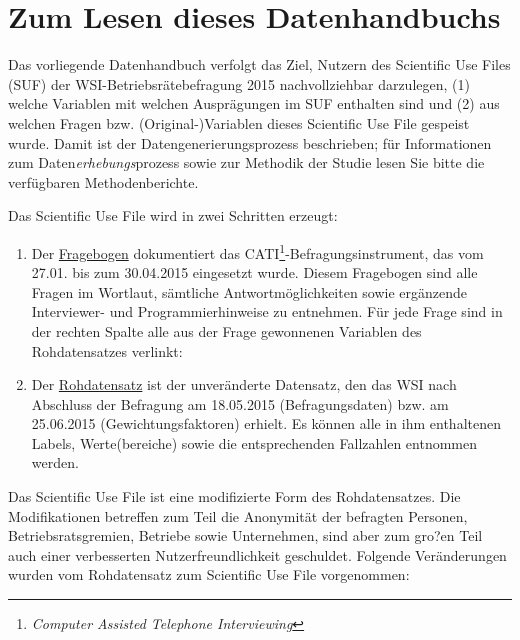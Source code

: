 \section{Zum Lesen dieses Datenhandbuchs}

Das vorliegende Datenhandbuch verfolgt das Ziel, Nutzern des Scientific Use Files (SUF) der WSI-Be\-triebs\-rä\-te\-be\-fra\-gung 2015 nachvollziehbar darzulegen, (1) welche Variablen mit welchen Ausprägungen im SUF enthalten sind und (2) aus welchen Fragen bzw. (Original-)Variablen dieses Scientific Use File gespeist wurde. Damit ist der Datengenerierungsprozess beschrieben; für Informationen zum Daten\textit{erhebungs}prozess sowie zur Methodik der Studie lesen Sie bitte die verfügbaren Methodenberichte.

Das Scientific Use File wird in zwei Schritten erzeugt:

\begin{enumerate}

\item Der \hyperref[kap_fragebogen]{Fragebogen} dokumentiert das CATI\footnote{\textit{Computer Assisted Telephone Interviewing}}-Befragungsinstrument, das vom 27.01. bis zum 30.04.2015 eingesetzt wurde. Diesem Fragebogen sind alle Fragen im Wortlaut, sämtliche Antwortmöglichkeiten sowie ergänzende Interviewer- und Programmierhinweise zu entnehmen. Für jede Frage sind in der rechten Spalte alle aus der Frage gewonnenen Variablen des \glqq Rohdatensatzes\grqq\xspace verlinkt:

\item Der \hyperref[kap_rohdaten]{Rohdatensatz} ist der unveränderte Datensatz, den das WSI nach Abschluss der Befragung am 18.05.2015 (Befragungsdaten) bzw. am 25.06.2015 (Gewichtungsfaktoren) erhielt. Es können alle in ihm enthaltenen Labels,  Werte(bereiche) sowie die entsprechenden  Fallzahlen entnommen werden. 

\end{enumerate}

Das Scientific Use File ist eine modifizierte Form des Rohdatensatzes. Die Modifikationen betreffen zum Teil die Anonymität der befragten Personen, Betriebsratsgremien, Betriebe sowie Unternehmen, sind aber zum gro?en Teil auch einer verbesserten Nutzerfreundlichkeit geschuldet. Folgende Veränderungen wurden vom Rohdatensatz zum Scientific Use File vorgenommen: 


